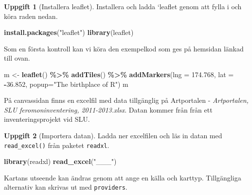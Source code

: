 \documentclass[
]{book}
\newenvironment{Shaded}{\begin{snugshade}}{\end{snugshade}}
\newcommand{\AttributeTok}[1]{\textcolor[rgb]{0.13,0.29,0.53}{#1}}
\newcommand{\FloatTok}[1]{\textcolor[rgb]{0.00,0.00,0.81}{#1}}
\newcommand{\FunctionTok}[1]{\textcolor[rgb]{0.13,0.29,0.53}{\textbf{#1}}}
\newcommand{\NormalTok}[1]{#1}
\newcommand{\OtherTok}[1]{\textcolor[rgb]{0.56,0.35,0.01}{#1}}
\newcommand{\SpecialCharTok}[1]{\textcolor[rgb]{0.81,0.36,0.00}{\textbf{#1}}}
\newcommand{\StringTok}[1]{\textcolor[rgb]{0.31,0.60,0.02}{#1}}
\theoremstyle{definition}
\theoremstyle{definition}
\theoremstyle{definition}
\newtheorem{exercise}{Uppgift}[chapter]
\theoremstyle{definition}
\theoremstyle{remark}
\begin{document}
\begin{exercise}[Installera leaflet]

Installera och ladda `leaflet genom att fylla i och köra raden nedan.

\begin{Shaded}
\begin{Highlighting}[]
\FunctionTok{install.packages}\NormalTok{(}\StringTok{"leaflet"}\NormalTok{)}
\FunctionTok{library}\NormalTok{(leaflet)}
\end{Highlighting}
\end{Shaded}

\end{exercise}

Som en första kontroll kan vi köra den exempelkod som ges på hemsidan länkad till ovan.

\begin{Shaded}
\begin{Highlighting}[]
\NormalTok{m }\OtherTok{\textless{}{-}} \FunctionTok{leaflet}\NormalTok{() }\SpecialCharTok{\%\textgreater{}\%}
  \FunctionTok{addTiles}\NormalTok{() }\SpecialCharTok{\%\textgreater{}\%}
  \FunctionTok{addMarkers}\NormalTok{(}\AttributeTok{lng =} \FloatTok{174.768}\NormalTok{, }\AttributeTok{lat =} \SpecialCharTok{{-}}\FloatTok{36.852}\NormalTok{, }\AttributeTok{popup=}\StringTok{"The birthplace of R"}\NormalTok{)}
\NormalTok{m}
\end{Highlighting}
\end{Shaded}

På canvassidan finns en excelfil med data tillgänglig på Artportalen - \emph{Artportalen, SLU feromoninventering, 2011-2013.xlsx}. Datan kommer från från ett inventeringsprojekt vid SLU.

\begin{exercise}[Importera datan]

Ladda ner excelfilen och läs in datan med \texttt{read\_excel()} från paketet \texttt{readxl}.

\begin{Shaded}
\begin{Highlighting}[]
\FunctionTok{library}\NormalTok{(readxl)}
\FunctionTok{read\_excel}\NormalTok{(}\StringTok{"\_\_\_"}\NormalTok{)}
\end{Highlighting}
\end{Shaded}

\end{exercise}

Kartans utseende kan ändras genom att ange en källa och karttyp. Tillgängliga alternativ kan skrivas ut med \texttt{providers}.
\end{document}
